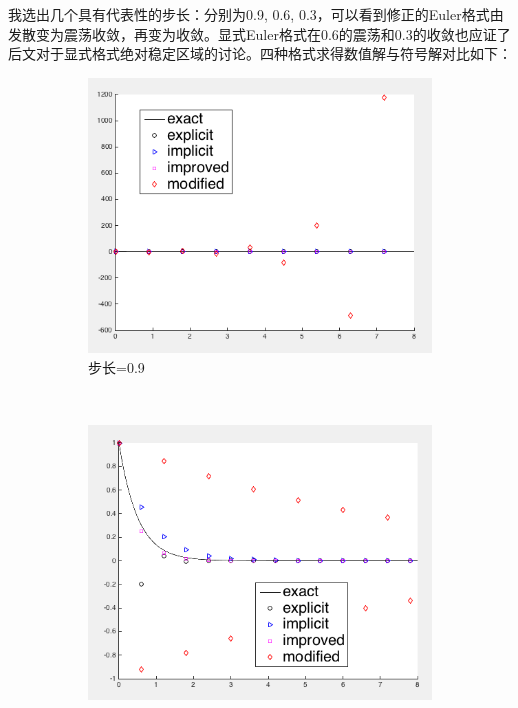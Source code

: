 \documentclass{homework}
\begin{document}
我选出几个具有代表性的步长：分别为0.9, 0.6, 0.3，可以看到修正的Euler格式由发散变为震荡收敛，再变为收敛。显式Euler格式在0.6的震荡和0.3的收敛也应证了后文对于显式格式绝对稳定区域的讨论。四种格式求得数值解与符号解对比如下：
\begin{figure}[H]
    \hspace{-6em}
    \begin{subfigure}[t]{0.42\textwidth}
        \includegraphics[width=\textwidth]{schemes-9.png}
        \caption{步长=0.9}
    \end{subfigure}~
    \begin{subfigure}[t]{0.42\textwidth}
        \includegraphics[width=\textwidth]{schemes-6.png}

\end{subfigure}
\end{figure}
\end{document}
